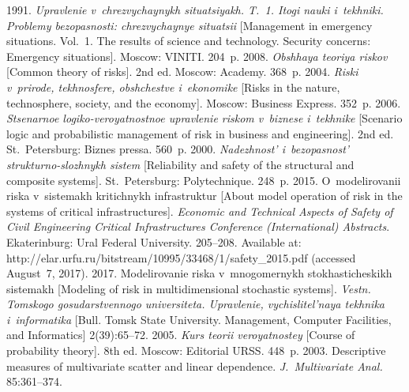 \begin{multicols}{2}
{{\begin{thebibliography}{99}
 1991. \textit{Up\-rav\-le\-nie v~chrez\-vy\-chay\-nykh si\-tu\-a\-tsi\-yakh. 
T.~1. Ito\-gi nau\-ki i~tekh\-ni\-ki. Prob\-le\-my bez\-opas\-nosti: 
chrezvychaynye situatsii} 
[Management in emergency situations. Vol.~1. The results of science and 
technology. Security concerns: Emergency situations]. Moscow: VINITI. 204~p.
 2008. \textit{Ob\-shhaya teo\-riya 
ris\-kov} [Common theory of risks]. 2nd ed. Moscow: Academy. 368~p.
 2004. \textit{Riski 
v~pri\-ro\-de, tekh\-no\-sfe\-re, ob\-shchest\-ve i~eko\-no\-mi\-ke} 
[Risks in the nature, technosphere, 
society, and the economy]. Moscow: Business Express. 352~p.
 2006. \textit{Stse\-nar\-noe 
lo\-gi\-ko-ve\-ro\-yat\-nost\-noe 
uprav\-le\-nie ris\-kom v~biz\-ne\-se i~tekh\-ni\-ke} [Scenario logic and probabilistic 
management of risk in business and engineering]. 2nd ed. St.\ Petersburg: Biznes 
pressa. 560~p.
 2000. \textit{Na\-dezh\-nost' i~bezopas\-nost'  
struk\-tur\-no-slozh\-nykh sis\-tem} [Reliability and safety of the structural and composite 
systems]. St.\ Petersburg: Polytechnique. 248~p.
 2015. O~mo\-de\-li\-ro\-va\-nii ris\-ka v~sis\-te\-makh kri\-tich\-nykh 
infra\-struk\-tur [About model operation of risk in the systems of critical infrastructures]. 
\textit{Economic and Technical Aspects of
Safety of Civil Engineering Critical Infrastructures
Conference (International) Abstracts}.
Ekaterinburg: Ural Federal University. 205--208.
 Available at: {\sf 
http://elar.urfu.ru/bitstream/10995/33468/1/safety\_\linebreak 2015.pdf}  (accessed August~7, 
2017).
 2017. Modelirovanie ris\-ka 
v~mno\-go\-mer\-nykh sto\-kha\-sti\-che\-skikh sis\-te\-makh [Modeling of risk in 
multidimensional stochastic systems]. \textit{Vestn. Tomskogo gosudarstvennogo 
universiteta. Upravlenie, vy\-chis\-li\-tel'\-naya tekh\-ni\-ka 
i~in\-for\-ma\-ti\-ka} [Bull. Tomsk State 
University. Management, Computer Facilities, and Informatics] 2(39):65--72.
 2005. \textit{Kurs teo\-rii ve\-ro\-yat\-no\-stey} [Course of 
probability theory]. 8th ed. Moscow: Editorial URSS. 448~p.
 2003. Descriptive measures of multivariate 
scatter and linear dependence.  \textit{J.~Multivariate Anal.} 85:361--374.

\end{thebibliography}}}
\end{multicols}
